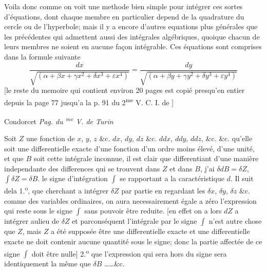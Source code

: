 \documentclass[11pt,a4paper]{article}
\begin{document}
Voila donc comme on voit une methode bien simple
pour intégrer ces sortes d'équations, dont chaque membre en
particulier depend de la quadrature du cercle ou de
l'hyperbole; mais il y a encore d'autres equations plus
générales que les précédentes qui admettent aussi des intégrales
algébriques, quoique chacun de leurs membres ne soient en
aucune façon intégrable.
Ces équations sont comprises dans la formule suivante
\[ \frac{dx}{\sqrt{(\alpha + \beta x + \gamma x^{2} + \delta x^{3} + \varepsilon x^{4})}} = \frac{dy}{\sqrt{(\alpha + \beta y + \gamma y^{2} + \delta y^{3} + \varepsilon y^{4})}} \]
[le reste du memoire qui contient environ 20 pages est copié presqu'en entier
depuis la page 77 jusqu'a la p. 91 du 2\textsuperscript{me} V.  C. I. de ]



Condorcet \emph{Pag.  du \textsuperscript{me} V. de Turin}

Soit $Z$ une fonction de $x$, $y$, $z$ \&c. $dx$, $dy$, $dz$ \&c. $ddx$, $ddy$, $ddz$, \&c. \&c.
qu'elle soit une differentielle exacte d'une fonction d'un ordre moins
élevé, d'une unité, et que $B$ soit cette intégrale inconnue, il est
clair que differentiant d'une manière independante des differences qui se
trouvent dans $Z$ et dans $B$, j'ai $\delta dB = \delta Z$, \quad $\int\delta Z = \delta B$. le signe
d'intégration $\int$ se rapportant a la caractéristique $d$. Il suit dela
1.\textsuperscript{o}, que cherchant a intégrer $\delta Z$ par partie en regardant les $\delta x$, $\delta y$, $\delta z$ \&c.
comme des variables ordinaires, on aura necessairement égale a zéro
l'expression qui reste sous le signe $\int$ sans pouvoir être reduite.
[en effet on a lors $dZ$ a intégrer aulieu de $\delta Z$ et parconséquent l'intégrale
par le signe $\int$ n'est autre chose que $Z$, mais $Z$ a été supposée être
une differentielle exacte et une differentielle exacte ne doit contenir
aucune quantité sous le signe; donc la partie  affectée de
ce signe $\int$ doit être nulle]
2.\textsuperscript{o} que l'expression qui sera hors du signe sera identiquement la même
que $\delta B$ \ldots\ldots \&c.
\end{document}
